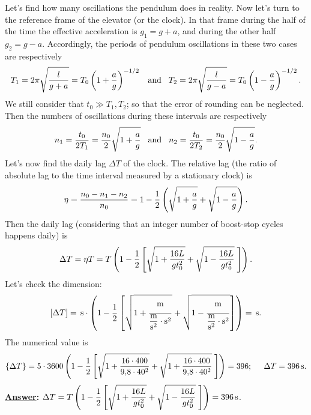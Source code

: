 \documentclass[11pt,a4paper]{article}
\begin{document}
Let's find how many oscillations the pendulum does in reality. Now let's turn to the reference frame of the elevator (or the clock). In that frame during the half of the time the effective acceleration is $g_1=g+a$, and during the other half $g_2=g-a$. Accordingly, the periods of pendulum oscillations in these two cases are respectively
$$
  T_1=2\pi\sqrt{\frac{l}{g+a}}=T_0\left(1+\frac{a}{g}\right)^{-1/2}\hspace{3mm}\text{and}\hspace{3mm} T_2=2\pi\sqrt{\frac{l}{g-a}}=T_0\left(1-\frac{a}{g}\right)^{-1/2}.
$$
We still consider that $t_0\gg T_1, T_2$; so that the error of rounding can be neglected.
Then the numbers of oscillations during these intervals are respectively
$$
  n_1=\frac{t_0}{2T_1}=\frac{n_0}{2}\sqrt{1+\frac{a}{g}\vphantom{\frac{l}{g+a}}}\hspace{3mm}\text{and}\hspace{3mm} n_2=\frac{t_0}{2T_2}=\frac{n_0}{2}\sqrt{1-\frac{a}{g}\vphantom{\frac{l}{g-a}}}.
$$
Let's now find the daily lag $\Delta T$ of the clock. The relative lag (the ratio of absolute lag to the time interval measured by a stationary clock) is
$$
  \eta=\frac{n_0-n_1-n_2}{n_0}=1-\frac{1}{2}\left(\sqrt{1+\frac{a}{g}\vphantom{\frac{l}{g+a}}}+\sqrt{1-\frac{a}{g}\vphantom{\frac{l}{g-a}}}\right).
$$
Then the daily lag (considering that an integer number of boost-stop cycles happens daily) is
$$
  \Delta T=\eta T=T\left(1-\frac{1}{2}\left[\sqrt{1+\frac{16L}{gt_0^2}}+\sqrt{1-\frac{16L}{gt_0^2}}\hspace{1mm}\right]\right).
$$
Let's check the dimension:
$$
  \left[\Delta T\right]=\,\text{s}\cdot\left(1-\frac{1}{2}\left[\sqrt{1+{\frac{\text{m}\vphantom{\dfrac{\text{m}}{\text{s}^2}}}{\dfrac{\text{m}}{\text{s}^2}\cdot\text{s}^2}}}+\sqrt{1-{\frac{\text{m}\vphantom{\dfrac{\text{m}}{\text{s}^2}}}{\dfrac{\text{m}}{\text{s}^2}\cdot\text{s}^2}}}\right]\right)=\,\text{s}.
$$
The numerical value is
$$
  \{\Delta T\}=5\cdot 3600\left(1-\frac{1}{2}\left[\sqrt{1+\frac{16\cdot 400}{9,\hspace{-0.5mm}8\cdot 40^2}\vphantom{\frac{l}{g+a}}}+\sqrt{1+\frac{16\cdot 400}{9,\hspace{-0.5mm}8\cdot 40^2}\vphantom{\frac{l}{g+a}}}\hspace{1mm}\right]\right)=396;\hspace{5mm} \Delta T=396\,\text{s}.
$$
\textbf{\underline{Answer}:} $\Delta T=T\left(1-\dfrac{1}{2}\left[\sqrt{1+\dfrac{16L}{gt_0^2}}+\sqrt{1-\dfrac{16L}{gt_0^2}}\hspace{1mm}\right]\right)=396\,\text{s}$.
\end{document}

